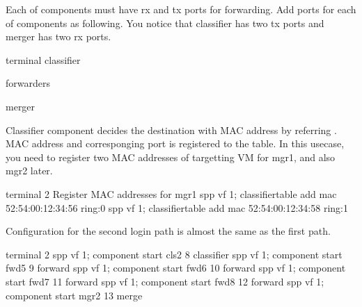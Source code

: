 \documentclass[a4paper,11pt,openany,oneside,english]{sphinxmanual}
\begin{document}
Each of components must have rx and tx ports for forwarding.
Add ports for each of components as following.
You notice that classifier has two tx ports and merger has two rx ports.

\begin{sphinxVerbatim}[commandchars=\\\{\},formatcom=\footnotesize]
 terminal 
 classifier

 forwarders

 merger
\end{sphinxVerbatim}

Classifier component decides the destination with MAC address by referring
. MAC address and corresponging port is registered to the
table. In this usecase, you need to register two MAC addresses of targetting
VM for mgr1, and also mgr2 later.

\begin{sphinxVerbatim}[commandchars=\\\{\},formatcom=\footnotesize]
\PYGZsh{} terminal 2
\PYGZsh{} Register MAC addresses for mgr1
spp \PYGZgt{} vf 1; classifier\PYGZus{}table add mac 52:54:00:12:34:56 ring:0
spp \PYGZgt{} vf 1; classifier\PYGZus{}table add mac 52:54:00:12:34:58 ring:1
\end{sphinxVerbatim}

Configuration for the second login path is almost the same as the first path.

\begin{sphinxVerbatim}[commandchars=\\\{\},formatcom=\footnotesize]
\PYGZsh{} terminal 2
spp \PYGZgt{} vf 1; component start cls2 8 classifier
spp \PYGZgt{} vf 1; component start fwd5 9 forward
spp \PYGZgt{} vf 1; component start fwd6 10 forward
spp \PYGZgt{} vf 1; component start fwd7 11 forward
spp \PYGZgt{} vf 1; component start fwd8 12 forward
spp \PYGZgt{} vf 1; component start mgr2 13 merge
\end{sphinxVerbatim}
\end{document}
